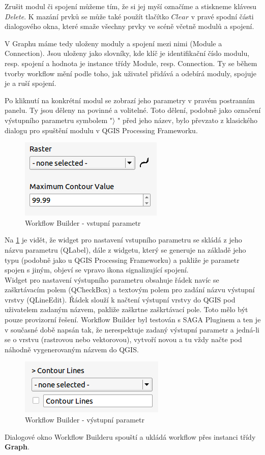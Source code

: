 Zrušit modul či spojení můžeme tím, že si jej myší označíme a
stiskneme klávesu \textit{Delete}. K mazání prvků se může také použít
tlačítko $Clear$ v pravé spodní části dialogového okna, které smaže
všechny prvky ve scéně včetně modulů a spojení.

V Graphu máme tedy uloženy moduly a spojení mezi nimi (Module a
Connection). Jsou uloženy jako slovníky, kde klíč je identifikační
číslo modulu, resp. spojení a hodnota je instance třídy Module,
resp. Connection. Ty se během tvorby workflow mění podle toho, jak
uživatel přidává a odebírá moduly, spojuje je a ruší spojení.


Po kliknutí na konkrétní modul se zobrazí jeho parametry v pravém
postranním panelu. Ty jsou děleny na povinné a volitelné. Toto dělení,
podobně jako označení výstupního parametru symbolem "$\rangle$ " před
jeho název, bylo převzato z klasického dialogu pro spuštění modulu v
QGIS Processing Frameworku. \\

\begin{figure}[h]
	\centering
	\includegraphics[scale=0.7]{pictures/wf/wf_inPar}
	\caption{Workflow Builder - vstupní parametr}
  	\label{wf:inPar}
\end{figure}

Na \figurename \ref{wf:inPar} je vidět, že widget pro nastavení
vstupního parametru se skládá z jeho názvu parametru (QLabel), dále z
widgetu, který se generuje na základě jeho typu (podobně jako u QGIS
Processing Frameworku) a pakliže je parametr spojen s jiným, objeví se
vpravo ikona signalizující spojení. \\

Widget pro nastavení výstupního parametru obsahuje řádek navíc se
zaškrtávacím polem (QCheckBox) a textovým polem pro zadání názvu
výstupní vrstvy (QLineEdit). Řádek slouží k načtení výstupní vrstvy do
QGIS pod uživatelem zadaným názvem, pakliže zaškrtne zaškrtávací
pole. Toto mělo být pouze provizorní řešení. Workflow Builder byl
testován s SAGA Pluginem a ten je v současné době napsán tak, že
nerespektuje zadaný výstupní parametr a jedná-li se o vrstvu
(rastrovou nebo vektorovou), vytvoří novou a tu vždy načte pod náhodně
vygenerovaným názvem do QGIS. \\

\begin{figure}[!]
	\centering
	\includegraphics[scale=0.7]{pictures/wf/wf_outPar}
	\caption{Workflow Builder - výstupní parametr}
  	\label{wf:outPar}
\end{figure}

Dialogové okno Workflow Builderu spouští a ukládá workflow přes instanci třídy \textbf{Graph}. 
